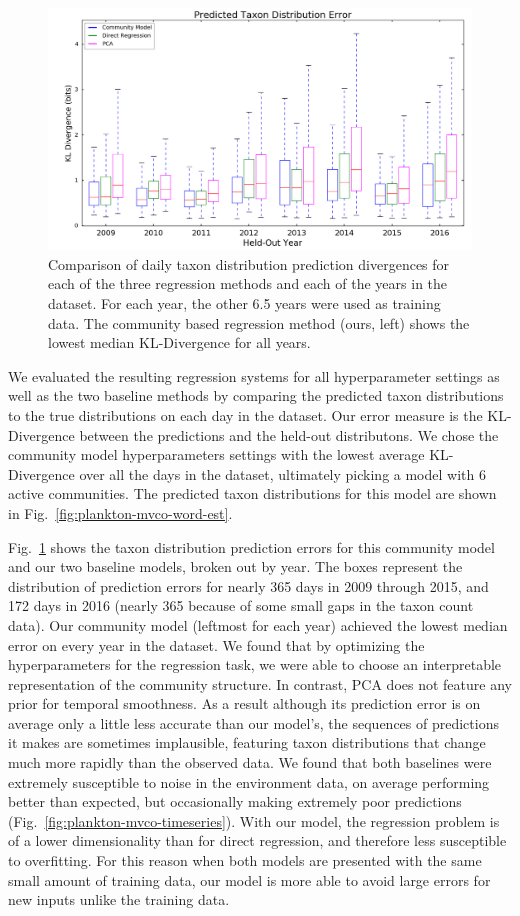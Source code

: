 \begin{figure}
    \centering
    \includegraphics[width=0.8\linewidth]{figures/oceans/KLDivergenceBoxplot-C.png}
    \caption{Comparison of daily taxon distribution prediction divergences for each of the three regression methods and each of the years in the dataset. For each year, the other 6.5 years were used as training data. The community based regression method (ours, left) shows the lowest median KL-Divergence for all years.}
    \label{fig:plankton-mvco-kl-boxplot}
\end{figure}

We evaluated the resulting regression systems for all hyperparameter settings as well as the two baseline methods by comparing the predicted taxon distributions to the true distributions on each day in the dataset. Our error measure is the KL-Divergence between the predictions and the held-out distributons. We chose the community model hyperparameters settings with the lowest average KL-Divergence over all the days in the dataset, ultimately picking a model with 6 active communities. The predicted taxon distributions for this model are shown in Fig.~\ref{fig:plankton-mvco-word-est}.

Fig.~\ref{fig:plankton-mvco-kl-boxplot} shows the taxon distribution prediction errors for this community model and our two baseline models, broken out by year. The boxes represent the distribution of prediction errors for nearly 365 days in 2009 through 2015, and 172 days in 2016 (nearly 365 because of some small gaps in the taxon count data). Our community model (leftmost for each year) achieved the lowest median error on every year in the dataset. We found that by optimizing the hyperparameters for the regression task, we were able to choose an interpretable representation of the community structure. In contrast, PCA does not feature any prior for temporal smoothness. As a result although its prediction error is on average only a little less accurate than our model's, the sequences of predictions it makes are sometimes implausible, featuring taxon distributions that change much more rapidly than the observed data. We found that both baselines were extremely susceptible to noise in the environment data, on average performing better than expected, but occasionally making extremely poor predictions (Fig.~\ref{fig:plankton-mvco-timeseries}). With our model, the regression problem is of a lower dimensionality than for direct regression, and therefore less susceptible to overfitting. For this reason when both models are presented with the same small amount of training data, our model is more able to avoid large errors for new inputs unlike the training data.

